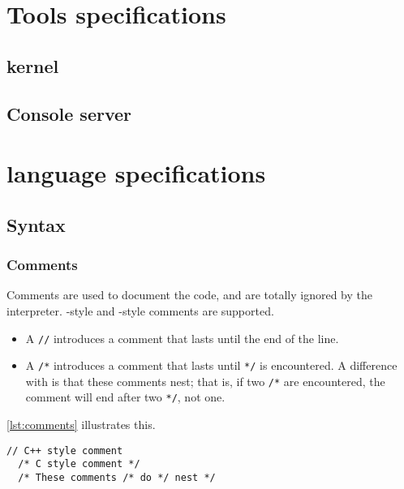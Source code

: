 \documentclass[openright,twoside,12pt]{report}
\begin{document}
\chapter{Tools specifications}
\label{sec:tools}

\section{\urbi kernel}
\section{Console server}
\section{\umake}

\FloatBarrier
\chapter{\us language specifications}
\label{sec:lang}

\FloatBarrier
\section{Syntax}
\subsection{Comments}

Comments are used to document the code, and are totally ignored by the
\us interpreter. \Cxx-style and \C-style comments are supported.

\begin{itemize}
\item A \lstinline|//| introduces a comment that lasts until the end
  of the line.
\item A \lstinline|/*| introduces a comment that lasts until
  \lstinline|*/| is encountered. A difference with \C is that these
  comments nest; that is, if two \lstinline|/*| are encountered, the
  comment will end after two \lstinline|*/|, not one.
\end{itemize}

\autoref{lst:comments} illustrates this.

\begin{lstlisting}[caption=Comments,label=lst:comments,float=\floatpos]
  // C++ style comment
  /* C style comment */
  /* These comments /* do */ nest */
\end{lstlisting}
\end{document}
